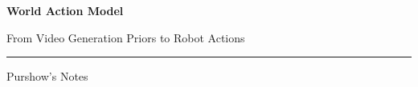 \documentclass[11pt,a4paper,fontset=none]{ctexart}
\begin{document}
\begin{titlepage}
  \centering
  \vspace*{0.20\textheight}
  {\Huge\bfseries\sffamily\color{wamblue} World Action Model\par}
  \vspace{1.2em}
  {\LARGE\sffamily From Video Generation Priors to Robot Actions\par}
  \vspace{2.2em}
  {\color{wamgray}\rule{0.54\textwidth}{0.6pt}\par}
  \vfill
  {\large\sffamily Purshow's Notes\par}
  \vspace*{0.10\textheight}
\end{titlepage}

\tableofcontents
\clearpage

\end{document}

